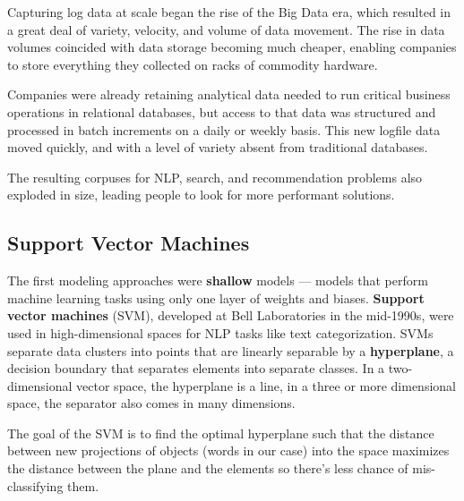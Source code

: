 \documentclass[11pt, table]{diazessay} %
\begin{document}
\begin{sloppypar}
Capturing log data at scale began the rise of the Big Data era, which resulted in a great deal of variety, velocity, and volume of data movement. The rise in data volumes coincided with data storage becoming much cheaper, enabling companies to store everything they collected on racks of commodity hardware.

Companies were already retaining analytical data needed to run critical business operations in relational databases, but access to that data was structured and processed in batch increments on a daily or weekly basis. This new logfile data moved quickly, and with a level of variety absent from traditional databases.

The resulting corpuses for NLP, search, and recommendation problems also exploded in size, leading people to look for more performant solutions.  


\subsection{Support Vector Machines}

The first modeling approaches were \textbf{shallow} models --- models that perform machine learning tasks using only one layer of weights and biases\citep{collobert2008unified}. \textbf{Support vector machines} (SVM), developed at Bell Laboratories in the mid-1990s,  were used in high-dimensional spaces for NLP tasks like text categorization\citep{joachims2005text}. SVMs separate data clusters into points that are linearly separable by a \textbf{hyperplane}, a decision boundary that separates elements into separate classes. In a two-dimensional vector space, the hyperplane is a line, in a three or more dimensional space, the separator also comes in many dimensions.

The goal of the SVM is to find the optimal hyperplane such that the distance between new projections of objects (words in our case) into the space maximizes the distance between the plane and the elements so there's less chance of mis-classifying them.

\begin{figure}[H]
\centering
{}
\end{figure}
\end{sloppypar}
\end{document}
